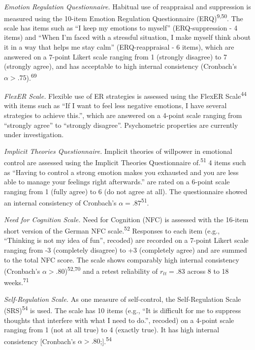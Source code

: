 \documentclass[
  english,
  man,floatsintext]{apa6}
\begin{document}
\emph{Emotion Regulation Questionnaire.}
Habitual use of reappraisal and suppression is measured using the 10-item Emotion Regulation Questionnaire (ERQ)\textsuperscript{9,50}.
The scale has items such as ``I keep my emotions to myself'' (ERQ-suppression - 4 items) and ``When I'm faced with a stressful situation, I make myself think about it in a way that helps me stay calm'' (ERQ-reappraisal - 6 items), which are answered on a 7-point Likert scale ranging from 1 (strongly disagree) to 7 (strongly agree), and has acceptable to high internal consistency (Cronbach's \(\alpha>.75\)).\textsuperscript{69}

\emph{FlexER Scale.}
Flexible use of ER strategies is assessed using the FlexER Scale\textsuperscript{44} with items such as ``If I want to feel less negative emotions, I have several strategies to achieve this.'', which are answered on a 4-point scale ranging from ``strongly agree'' to ``strongly disagree''.
Psychometric properties are currently under investigation.

\emph{Implicit Theories Questionnaire.}
Implicit theories of willpower in emotional control are assessed using the Implicit Theories Questionnaire of.\textsuperscript{51}
4 items such as ``Having to control a strong emotion makes you exhausted and you are less able to manage your feelings right afterwards.'' are rated on a 6-point scale ranging from 1 (fully agree) to 6 (do not agree at all).
The questionnaire showed an internal consistency of Cronbach's \(\alpha=.87\)\textsuperscript{51}.

\emph{Need for Cognition Scale.}
Need for Cognition (NFC) is assessed with the 16-item short version of the German NFC scale.\textsuperscript{52}
Responses to each item (e.g., ``Thinking is not my idea of fun'', recoded) are recorded on a 7-point Likert scale ranging from -3 (completely disagree) to +3 (completely agree) and are summed to the total NFC score.
The scale shows comparably high internal consistency (Cronbach's \(\alpha>.80\))\textsuperscript{52,70} and a retest reliability of \(r_{tt}=.83\) across 8 to 18 weeks.\textsuperscript{71}

\emph{Self-Regulation Scale.}
As one measure of self-control, the Self-Regulation Scale (SRS)\textsuperscript{54} is used.
The scale has 10 items (e.g., ``It is difficult for me to suppress thoughts that interfere with what I need to do.'', recoded) on a 4-point scale ranging from 1 (not at all true) to 4 (exactly true).
It has high internal consistency {[}Cronbach's \(\alpha>.80\);{]}.\textsuperscript{54}
\end{document}
